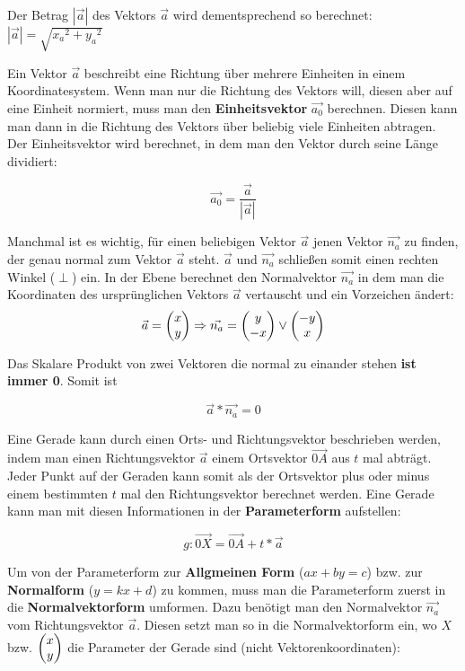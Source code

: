Der Betrag $|\vec{a}|$ des Vektors $\vec{a}$ wird dementsprechend so berechnet: $ |\vec{a}| = \sqrt{{x_{a}}^2 + {y_{a}}^2}$


Ein Vektor $\vec{a}$ beschreibt eine Richtung \"{u}ber mehrere Einheiten in einem Koordinatesystem. Wenn man nur die Richtung des Vektors will, diesen aber auf eine Einheit normiert, muss man den \textbf{Einheitsvektor} $\vec{a_{0}}$ berechnen. Diesen kann man dann in die Richtung des Vektors \"{u}ber beliebig viele Einheiten abtragen. Der Einheitsvektor wird berechnet, in dem man den Vektor durch seine L\"{a}nge dividiert:

$$\vec{a_{0}} = \frac{\vec{a}}{|\vec{a}|}$$


Manchmal ist es wichtig, f\"{u}r einen beliebigen Vektor $\vec{a}$ jenen Vektor $\vec{n_{a}}$ zu finden, der genau normal zum Vektor $\vec{a}$ steht. $\vec{a}$ und $\vec{n_{a}}$ schlie\ss{}en somit einen rechten Winkel ($\perp$) ein. In der Ebene berechnet den Normalvektor $\vec{n_{a}}$ in dem man die Koordinaten des urspr\"{u}nglichen Vektors $\vec{a}$ vertauscht und ein Vorzeichen \"{a}ndert:
$$ \vec{a} = \begin{pmatrix}x\\y\end{pmatrix} \Rightarrow \vec{n_{a}} = \begin{pmatrix}y \\ -x\end{pmatrix} \lor \begin{pmatrix}-y \\ x\end{pmatrix}$$

Das Skalare Produkt von zwei Vektoren die normal zu einander stehen \textbf{ist immer 0}. Somit ist

$$\vec{a} * \vec{n_{a}} = 0$$

\pagebreak



Eine Gerade kann durch einen Orts- und Richtungsvektor beschrieben werden, indem man einen Richtungsvektor $\vec{a}$ einem Ortsvektor $\vec{0A}$ aus $t$ mal abtr\"{a}gt. Jeder Punkt auf der Geraden kann somit als der Ortsvektor plus oder minus einem bestimmten $t$ mal den Richtungsvektor berechnet werden. Eine Gerade kann man mit diesen Informationen in der \textbf{Parameterform} aufstellen:

$$g: \vec{0X} = \vec{0A} + t * \vec{a}$$


Um von der Parameterform zur \textbf{Allgmeinen Form} ($ax + by = c$) bzw. zur \textbf{Normalform} ($y = kx + d$) zu kommen, muss man die Parameterform zuerst in die \textbf{Normalvektorform} umformen. Dazu ben\"{o}tigt man den Normalvektor $\vec{n_{a}}$ vom Richtungsvektor $\vec{a}$. Diesen setzt man so in die Normalvektorform ein, wo $X$ bzw. $\begin{pmatrix}x\\y\end{pmatrix}$ die Parameter der Gerade sind (nicht Vektorenkoordinaten):

